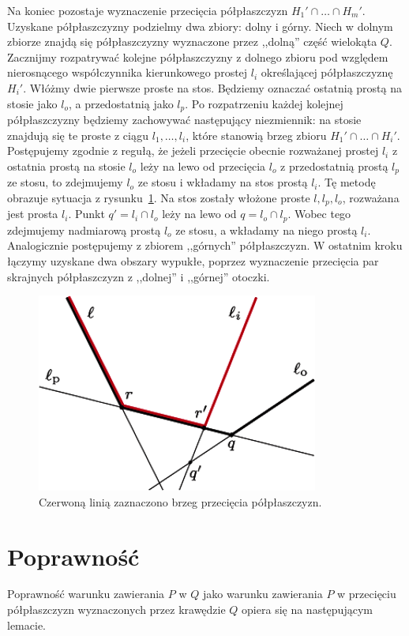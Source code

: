 Na koniec pozostaje wyznaczenie przecięcia półpłaszczyzn $H_1' \cap
\ldots \cap H_m'$. Uzyskane półpłaszczyzny podzielmy dwa zbiory: dolny
i górny. Niech w dolnym zbiorze znajdą się półpłaszczyzny wyznaczone
przez ,,dolną'' część wielokąta $Q$. Zacznijmy rozpatrywać kolejne
półpłaszczyzny z dolnego zbioru pod względem nierosnącego
współczynnika kierunkowego prostej $l_i$ określającej półpłaszczyznę
$H_i'$. Włóżmy dwie pierwsze proste na stos. Będziemy oznaczać
ostatnią prostą na stosie jako $l_o$, a przedostatnią jako $l_p$. Po
rozpatrzeniu każdej kolejnej półpłaszczyzny będziemy zachowywać
następujący niezmiennik: na stosie znajdują się te proste z ciągu
$l_1, \ldots, l_i$, które stanowią brzeg zbioru $H_1' \cap \ldots \cap
H_i'$. Postępujemy zgodnie z regułą, że jeżeli przecięcie obecnie
rozważanej prostej $l_i$ z ostatnia prostą na stosie $l_o$ leży na
lewo od przecięcia $l_o$ z przedostatnią prostą $l_p$ ze stosu, to
zdejmujemy $l_o$ ze stosu i wkładamy na stos prostą $l_i$. Tę metodę
obrazuje sytuacja z rysunku~\ref{img:containment2}. Na stos zostały
włożone proste $l, l_p, l_o$, rozważana jest prosta $l_i$. Punkt $q' =
l_i \cap l_o$ leży na lewo od $q = l_o \cap l_p$. Wobec tego
zdejmujemy nadmiarową prostą $l_o$ ze stosu, a wkładamy na niego
prostą $l_i$. Analogicznie postępujemy z zbiorem ,,górnych''
półpłaszczyzn. W ostatnim kroku łączymy uzyskane dwa obszary wypukłe,
poprzez wyznaczenie przecięcia par skrajnych półpłaszczyzn z
,,dolnej'' i ,,górnej'' otoczki.

\begin{figure}[htb]
  \centering
  \includegraphics[scale=0.6]{img/containment2}
  \caption{\label{img:containment2} Czerwoną linią zaznaczono brzeg
    przecięcia półpłaszczyzn.}
\end{figure}

\section{Poprawność}
Poprawność warunku zawierania $P$ w $Q$ jako warunku zawierania $P$ w
przecięciu półpłaszczyzn wyznaczonych przez krawędzie $Q$ opiera się
na następującym lemacie.

